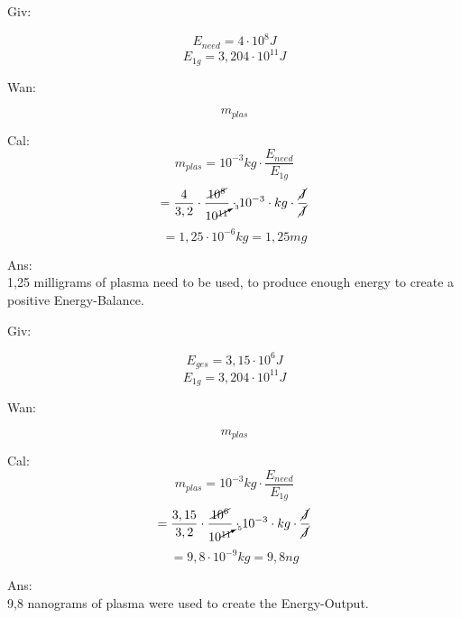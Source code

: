 \documentclass{article}
\begin{document}
Giv:

\[ E_{need}=4 \cdot 10^8 J \]
\[ E_{1g}=3,204\cdot 10^{11} J \]

Wan:

\[ m_{plas} \]

Cal:
\[ m_{plas}=10^{-3}kg \cdot \frac{E_{need}}{E_{1g}} \]
\[ = \frac{4}{3,2}\cdot \frac{\cancel{10^8}}{10^{\cancelto{3}{11}}}\cdot 10^{-3}\cdot kg \cdot \frac{\cancel{J}}{\cancel{J}} \]
\[ = 1,25\cdot 10^{-6} kg = 1,25mg \]

Ans: \\
1,25 milligrams of plasma need to be used, to produce enough energy to create a positive Energy-Balance.

\newpage

Giv:

\[ E_{ges}=3,15 \cdot 10^6 J \]
\[ E_{1g}=3,204\cdot 10^{11} J \]

Wan:

\[ m_{plas} \]

Cal:
\[ m_{plas}=10^{-3}kg \cdot \frac{E_{need}}{E_{1g}} \]
\[ = \frac{3,15}{3,2}\cdot \frac{\cancel{10^6}}{10^{\cancelto{5}{11}}}\cdot 10^{-3}\cdot kg \cdot \frac{\cancel{J}}{\cancel{J}} \]
\[ = 9,8\cdot 10^{-9} kg = 9,8ng \]

Ans: \\
9,8 nanograms of plasma were used to create the Energy-Output.
\end{document}
